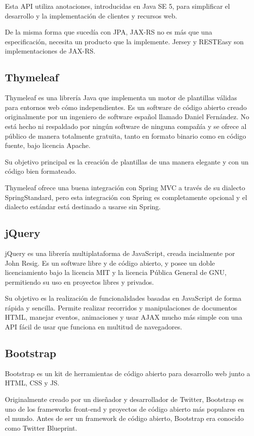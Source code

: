 Esta API utiliza anotaciones, introducidas en Java SE 5, para simplificar el desarrollo y la implementación de clientes y recursos web. 

De la misma forma que sucedía con JPA, JAX-RS no es más que una especificación, necesita un producto que la implemente. Jersey y RESTEasy son implementaciones de JAX-RS.

\subsection{Thymeleaf}
Thymeleaf es una librería Java que implementa un motor de plantillas válidas para entornos web cómo independientes. Es un software de código abierto creado originalmente por un ingeniero de software español llamado Daniel Fernández. No está hecho ni respaldado por ningún software de ninguna compañía y se ofrece al público de manera totalmente gratuita, tanto en formato binario como en código fuente, bajo licencia Apache.

Su objetivo principal es la creación de plantillas de una manera elegante y con un código bien formateado.

Thymeleaf ofrece una buena integración con Spring MVC a través de su dialecto SpringStandard, pero esta integración con Spring es completamente opcional y el dialecto estándar está destinado a usarse sin Spring.

\subsection{jQuery}
jQuery es una librería multiplataforma de JavaScript, creada incialmente por John Resig. Es un software libre y de código abierto, y posee un doble licenciamiento bajo la licencia MIT y la licencia Pública General de GNU, permitiendo su uso en proyectos libres y privados.

Su objetivo es la realización de funcionalidades basadas en JavaScript de forma rápida y sencilla. Permite realizar recorridos y manipulaciones de documentos HTML, manejar eventos, animaciones y usar AJAX  mucho más simple con una API fácil de usar que funciona en multitud de navegadores.

\subsection{Bootstrap}
Bootstrap es un kit de herramientas de código abierto para desarrollo web junto a HTML, CSS y JS.  

Originalmente creado por un diseñador y desarrollador de Twitter, Bootstrap es uno de los frameworks front-end y proyectos de código abierto más populares en el mundo. Antes de ser un framework de código abierto, Bootstrap era conocido como Twitter Blueprint.

